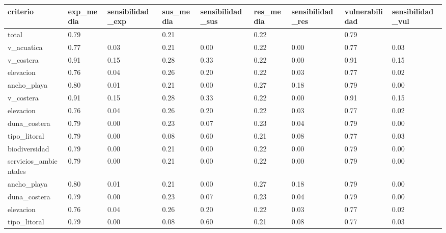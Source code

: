 \documentclass[letterpaper,10pt,spanish]{sphinxmanual}
\begin{document}
\begin{savenotes}\sphinxattablestart
\centering
{}
\sphinxthecaptionisattop
{}\label{\detokenize{analisis:id1}}
\sphinxaftertopcaption
\begin{tabulary}{\linewidth}[t]{|T|T|T|T|T|T|T|T|T|}
\hline
\sphinxstyletheadfamily 
criterio
&\sphinxstyletheadfamily 
exp\_media
&\sphinxstyletheadfamily 
sensibilidad\_exp
&\sphinxstyletheadfamily 
sus\_media
&\sphinxstyletheadfamily 
sensibilidad\_sus
&\sphinxstyletheadfamily 
res\_media
&\sphinxstyletheadfamily 
sensibilidad\_res
&\sphinxstyletheadfamily 
vulnerabilidad
&\sphinxstyletheadfamily 
sensibilidad\_vul
\\
\hline
total
&
0.79
&&
0.21
&&
0.22
&&
0.79
&\\
\hline
v\_acuatica
&
0.77
&
0.03
&
0.21
&
0.00
&
0.22
&
0.00
&
0.77
&
0.03
\\
\hline
v\_costera
&
0.91
&
0.15
&
0.28
&
0.33
&
0.22
&
0.00
&
0.91
&
0.15
\\
\hline
elevacion
&
0.76
&
0.04
&
0.26
&
0.20
&
0.22
&
0.03
&
0.77
&
0.02
\\
\hline
ancho\_playa
&
0.80
&
0.01
&
0.21
&
0.00
&
0.27
&
0.18
&
0.79
&
0.00
\\
\hline
v\_costera
&
0.91
&
0.15
&
0.28
&
0.33
&
0.22
&
0.00
&
0.91
&
0.15
\\
\hline
elevacion
&
0.76
&
0.04
&
0.26
&
0.20
&
0.22
&
0.03
&
0.77
&
0.02
\\
\hline
duna\_costera
&
0.79
&
0.00
&
0.23
&
0.07
&
0.23
&
0.04
&
0.79
&
0.00
\\
\hline
tipo\_litoral
&
0.79
&
0.00
&
0.08
&
0.60
&
0.21
&
0.08
&
0.77
&
0.03
\\
\hline
biodiversidad
&
0.79
&
0.00
&
0.21
&
0.00
&
0.22
&
0.00
&
0.79
&
0.00
\\
\hline
servicios\_ambientales
&
0.79
&
0.00
&
0.21
&
0.00
&
0.22
&
0.00
&
0.79
&
0.00
\\
\hline
ancho\_playa
&
0.80
&
0.01
&
0.21
&
0.00
&
0.27
&
0.18
&
0.79
&
0.00
\\
\hline
duna\_costera
&
0.79
&
0.00
&
0.23
&
0.07
&
0.23
&
0.04
&
0.79
&
0.00
\\
\hline
elevacion
&
0.76
&
0.04
&
0.26
&
0.20
&
0.22
&
0.03
&
0.77
&
0.02
\\
\hline
tipo\_litoral
&
0.79
&
0.00
&
0.08
&
0.60
&
0.21
&
0.08
&
0.77
&
0.03
\\
\hline
\end{tabulary}
\par
\sphinxattableend\end{savenotes}
\end{document}
